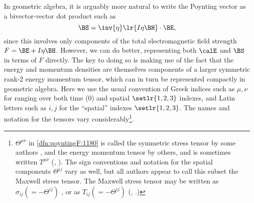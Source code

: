 In geometric algebra, it is arguably more natural to write the Poynting vector as a bivector-vector dot product such as
\begin{equation}\label{eqn:poyntingF:1100}
\BS = \inv{\eta} \lr{ I \eta \BH } \cdot \BE,
\end{equation}
since this involves only components of the total electromagnetic field strength \( F = \BE + I \eta \BH \).
However, we can do better, representing both \( \calE \) and \( \BS \) in terms of \( F \) directly.  The key to doing so is making use of the fact that
the energy and momentum densities are themselves components of a larger symmetric rank-2 energy momentum tensor, which can in turn be represented
compactly in geometric algebra.
\index{\(\Theta^{\mu\nu}\)}
\index{\(\lrT\)}
Here we use the usual convention of Greek indices such as \( \mu,\nu \) for ranging over both time (0) and spatial \( \setlr{1,2,3} \) indexes, and Latin letters such as \( i, j \)
for the ``spatial'' indexes
\( \setlr{1,2,3} \).
The names and notation for the tensors vary considerably\footnote{\( \Theta^{\mu\nu} \) in
\cref{dfn:poyntingF:1180}
is called the symmetric
stress tensor by some authors \citep{jackson1975cew},
and the energy momentum tensor by others, and is sometimes written \( T^{\mu\nu} \) (\citep{landau1980classical}, \citep{doran2003gap}).
The sign conventions and notation for the spatial components \( \Theta^{ij} \) vary as well, but all authors appear to call this subset the Maxwell stress tensor.
The Maxwell stress tensor may be written as \( \sigma_{ij} (=-\Theta^{ij}) \) \citep{landau1980classical}, or as
\( T_{ij} (=-\Theta^{ij}) \)
(\citep{griffiths1999introduction}, \citep{jackson1975cew}.)
}.

